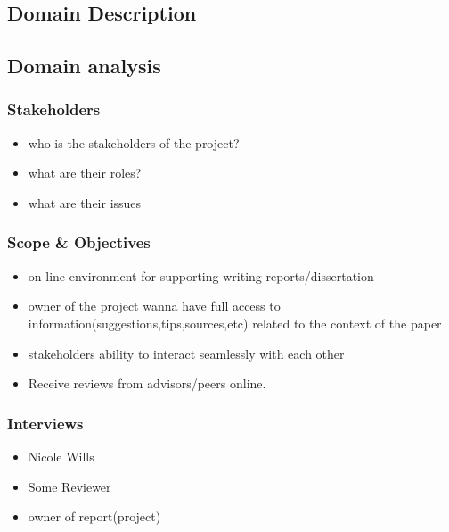 \subsection{Domain Description} %
\label{sub:problem_description}
\subsection{Domain analysis} %
\subsubsection{Stakeholders} %
\begin{itemize}
	\item who is the stakeholders of the project?
	\item what are their roles?
	\item what are their issues
\end{itemize}
\subsubsection{Scope \& Objectives}
\begin{itemize}
	\item on line environment for supporting writing reports/dissertation
	\item owner of the project wanna have full access to information(suggestions,tips,sources,etc) related to the context of the paper
	\item stakeholders ability to interact seamlessly with each other
	\item Receive reviews from advisors/peers online.
\end{itemize}
\subsubsection{Interviews} %
\begin{itemize}
	\item Nicole Wills
	\item Some Reviewer
	\item owner of report(project)
\end{itemize}

 